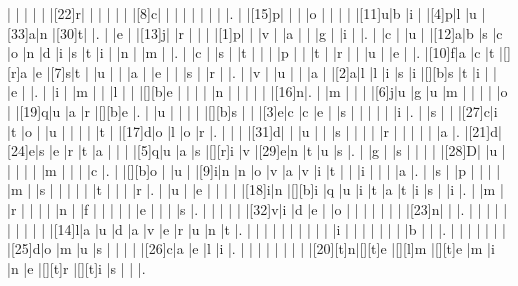 \documentclass[12pt]{article}
\begin{document}
\begin{Puzzle}{22}{24}
  |{}  |{}  |{}  |{}  |{}  |[22]r|{}  |{}  |{}  |{}  |{}  |{}  |[8]c|{}  |{}  |{}  |{}  |{}  |{}  |{}  |{}  |.
  |{}  |[15]p|{}  |{}  |{}  |o   |{}  |{}  |{}  |{}  |[11]u|b   |i   |{}  |[4]p|l   |u   |[33]a|n   |[30]t|{}  |.
  |{}  |e   |{}  |[13]j|{}  |r   |{}  |{}  |{}  |[1]p|{}  |{}  |v   |{}  |a   |{}  |{}  |g   |{}  |i   |{}  |.
  |{}  |c   |{}  |u   |{}  |[12]a|b   |s   |c   |o   |n   |d   |i   |s   |t   |i   |{}  |n   |{}  |m   |{}  |.
  |{}  |c   |{}  |s   |{}  |t   |{}  |{}  |{}  |p   |{}  |{}  |t   |{}  |r   |{}  |{}  |u   |{}  |e   |{}  |.
  |[10]f|a   |c   |t   |[][r]a   |e   |[7]s|t   |{}  |u   |{}  |{}  |a   |{}  |e   |{}  |{}  |s   |{}  |r   |{}  |.
  |{}  |v   |{}  |u   |{}  |{}  |a   |{}  |[2]a|l   |l   |i   |s   |i   |[][b]s   |t   |i   |{}  |{}  |e   |{}  |.
  |{}  |i   |{}  |m   |{}  |{}  |l   |{}  |{}  |[][b]e   |{}  |{}  |{}  |{}  |n   |{}  |{}  |{}  |{}  |{}  |[16]n|.
  |{}  |m   |{}  |{}  |{}  |[6]j|u   |g   |u   |m   |{}  |{}  |{}  |{}  |o   |{}  |[19]q|u   |a   |r   |[][b]e   |.
  |{}  |u   |{}  |{}  |{}  |{}  |[][b]s   |{}  |{}  |[3]e|c   |c   |e   |{}  |s   |{}  |{}  |{}  |{}  |{}  |i   |.
  |{}  |s   |{}  |{}  |[27]c|i   |t   |o   |{}  |u   |{}  |{}  |{}  |{}  |t   |{}  |[17]d|o   |l   |o   |r   |.
  |{}  |{}  |{}  |[31]d|{}  |{}  |u   |{}  |{}  |s   |{}  |{}  |{}  |{}  |r   |{}  |{}  |{}  |{}  |{}  |a   |.
  |[21]d|[24]e|s   |e   |r   |t   |a   |{}  |{}  |{}  |[5]q|u   |a   |s   |[][r]i   |v   |[29]e|n   |t   |u   |s   |.
  |{}  |g   |{}  |s   |{}  |{}  |{}  |{}  |[28]D|{}  |u   |{}  |{}  |{}  |{}  |{}  |m   |{}  |{}  |{}  |c   |.
  |{}  |[][b]o   |{}  |u   |{}  |[9]i|n   |n   |o   |v   |a   |v   |i   |t   |{}  |{}  |i   |{}  |{}  |{}  |a   |.
  |{}  |s   |{}  |p   |{}  |{}  |{}  |{}  |m   |{}  |s   |{}  |{}  |{}  |{}  |{}  |t   |{}  |{}  |{}  |r   |.
  |{}  |u   |{}  |e   |{}  |{}  |{}  |{}  |[18]i|n   |[][b]i   |q   |u   |i   |t   |a   |t   |i   |s   |{}  |i   |.
  |{}  |m   |{}  |r   |{}  |{}  |{}  |{}  |n   |{}  |f   |{}  |{}  |{}  |{}  |{}  |e   |{}  |{}  |{}  |s   |.
  |{}  |{}  |{}  |{}  |{}  |[32]v|i   |d   |e   |{}  |o   |{}  |{}  |{}  |{}  |{}  |{}  |{}  |[23]n|{}  |{}  |.
  |{}  |{}  |{}  |{}  |{}  |{}  |{}  |{}  |{}  |{}  |[14]l|a   |u   |d   |a   |v   |e   |r   |u   |n   |t   |.
  |{}  |{}  |{}  |{}  |{}  |{}  |{}  |{}  |{}  |{}  |i   |{}  |{}  |{}  |{}  |{}  |{}  |{}  |b   |{}  |{}  |.
  |{}  |{}  |{}  |{}  |{}  |{}  |{}  |[25]d|o   |m   |u   |s   |{}  |{}  |{}  |{}  |[26]c|a   |e   |l   |i   |.
  |{}  |{}  |{}  |{}  |{}  |{}  |{}  |{}  |[20][t]n|[][t]e   |[][l]m   |[][t]e   |m   |i   |n   |e   |[][t]r   |[][t]i   |s   |{}  |{}  |.
\end{Puzzle}
\end{document}
